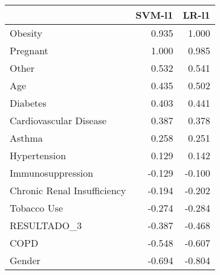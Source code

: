 \begin{tabular}{lrr}
\toprule
{} &  SVM-l1 &  LR-l1 \\
\midrule
Obesity                     &   0.935 &  1.000 \\
Pregnant                    &   1.000 &  0.985 \\
Other                       &   0.532 &  0.541 \\
Age                         &   0.435 &  0.502 \\
Diabetes                    &   0.403 &  0.441 \\
Cardiovascular Disease      &   0.387 &  0.378 \\
Asthma                      &   0.258 &  0.251 \\
Hypertension                &   0.129 &  0.142 \\
Immunosuppression           &  -0.129 & -0.100 \\
Chronic Renal Insufficiency &  -0.194 & -0.202 \\
Tobacco Use                 &  -0.274 & -0.284 \\
RESULTADO\_3                 &  -0.387 & -0.468 \\
COPD                        &  -0.548 & -0.607 \\
Gender                      &  -0.694 & -0.804 \\
\bottomrule
\end{tabular}
